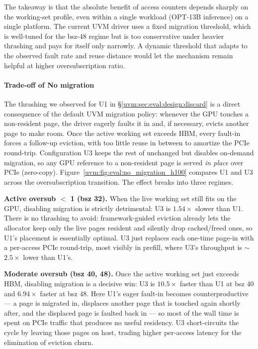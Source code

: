 The takeaway is that the absolute benefit of access counters
    depends sharply on the working-set profile,
    even within a single workload (OPT-13B inference) on a single platform.
The current UVM driver uses a fixed migration threshold,
    which is well-tuned for the bsz-48 regime
    but is too conservative under heavier thrashing
    and pays for itself only narrowly.
A dynamic threshold that adapts to the observed fault rate and reuse distance
    would let the mechanism remain helpful at higher oversubscription ratio.
\paragraph{Trade-off of No migration}
\label{uvm:sec:eval:design:direct}

The thrashing we observed for U1 in \S\ref{uvm:sec:eval:design:discard}
    is a direct consequence of the default UVM migration policy:
    whenever the GPU touches a non-resident page,
    the driver eagerly faults it in
    and, if necessary, evicts another page to make room.
Once the active working set exceeds HBM,
    every fault-in forces a follow-up eviction,
    with too little reuse in between to amortize the PCIe round-trip.
Configuration U3 keeps the rest of {\uvmname} unchanged
    but disables on-demand migration,
    so any GPU reference to a non-resident page
    is served \emph{in place} over PCIe (zero-copy).
Figure~\ref{uvm:fig:eval:no_migration_h100} compares U1 and U3 across the oversubscription transition.
The effect breaks into three regimes.

\textbf{Active oversub $<$ 1 (bsz 32).}
When the live working set still fits on the GPU,
    disabling migration is strictly detrimental:
    U3 is $1.54\times$ slower than U1.
There is no thrashing to avoid:
    framework-guided eviction already lets the allocator keep only the live pages resident
    and silently drop cached/freed ones,
    so U1's placement is essentially optimal.
U3 just replaces each one-time page-in with a per-access PCIe round-trip,
    most visibly in prefill,
    where U3's throughput is $\sim$$2.5\times$ lower than U1's.

\textbf{Moderate oversub (bsz 40, 48).}
Once the active working set just exceeds HBM,
    disabling migration is a decisive win:
    U3 is $10.5\times$ faster than U1 at bsz 40
    and $6.94\times$ faster at bsz 48.
Here U1's eager fault-in becomes counterproductive
    --- a page is migrated in, displaces another page that is touched again shortly after,
    and the displaced page is faulted back in ---
    so most of the wall time is spent on PCIe traffic that produces no useful residency.
U3 short-circuits the cycle by leaving those pages on host,
    trading higher per-access latency for the elimination of eviction churn.

